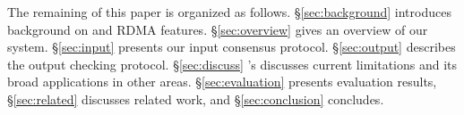 
The remaining of this paper is organized as follows. \S\ref{sec:background} 
introduces background on \paxos and RDMA features. \S\ref{sec:overview} gives 
an overview of our \xxx system. \S\ref{sec:input} presents our input consensus 
protocol. \S\ref{sec:output} describes the output checking protocol. 
\S\ref{sec:discuss} \xxx's discusses current limitations and its broad 
applications in other areas. \S\ref{sec:evaluation} presents evaluation 
results, \S\ref{sec:related} discusses related work, and \S\ref{sec:conclusion} 
concludes.   